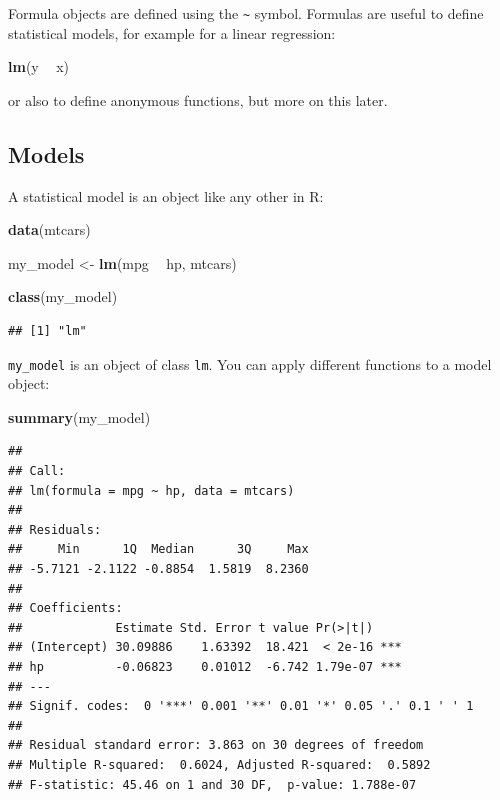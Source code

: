 \documentclass[]{gitbook}
\newenvironment{Shaded}{\begin{snugshade}}{\end{snugshade}}
\newcommand{\KeywordTok}[1]{\textcolor[rgb]{0.13,0.29,0.53}{\textbf{#1}}}
\newcommand{\NormalTok}[1]{#1}
\newcommand{\OperatorTok}[1]{\textcolor[rgb]{0.81,0.36,0.00}{\textbf{#1}}}
\newcommand{\StringTok}[1]{\textcolor[rgb]{0.31,0.60,0.02}{#1}}
\theoremstyle{definition}
\theoremstyle{definition}
\theoremstyle{definition}
\theoremstyle{remark}
\begin{document}
Formula objects are defined using the \texttt{\textasciitilde{}} symbol.
Formulas are useful to define statistical models, for example for a
linear regression:

\begin{Shaded}
\begin{Highlighting}[]
\KeywordTok{lm}\NormalTok{(y }\OperatorTok{~}\StringTok{ }\NormalTok{x)}
\end{Highlighting}
\end{Shaded}

or also to define anonymous functions, but more on this later.

\hypertarget{models}{%
\subsection{Models}\label{models}}

A statistical model is an object like any other in R:

\begin{Shaded}
\begin{Highlighting}[]
\KeywordTok{data}\NormalTok{(mtcars)}

\NormalTok{my_model <-}\StringTok{ }\KeywordTok{lm}\NormalTok{(mpg }\OperatorTok{~}\StringTok{ }\NormalTok{hp, mtcars)}

\KeywordTok{class}\NormalTok{(my_model)}
\end{Highlighting}
\end{Shaded}

\begin{verbatim}
## [1] "lm"
\end{verbatim}

\texttt{my\_model} is an object of class \texttt{lm}. You can apply
different functions to a model object:

\begin{Shaded}
\begin{Highlighting}[]
\KeywordTok{summary}\NormalTok{(my_model)}
\end{Highlighting}
\end{Shaded}

\begin{verbatim}
## 
## Call:
## lm(formula = mpg ~ hp, data = mtcars)
## 
## Residuals:
##     Min      1Q  Median      3Q     Max 
## -5.7121 -2.1122 -0.8854  1.5819  8.2360 
## 
## Coefficients:
##             Estimate Std. Error t value Pr(>|t|)    
## (Intercept) 30.09886    1.63392  18.421  < 2e-16 ***
## hp          -0.06823    0.01012  -6.742 1.79e-07 ***
## ---
## Signif. codes:  0 '***' 0.001 '**' 0.01 '*' 0.05 '.' 0.1 ' ' 1
## 
## Residual standard error: 3.863 on 30 degrees of freedom
## Multiple R-squared:  0.6024, Adjusted R-squared:  0.5892 
## F-statistic: 45.46 on 1 and 30 DF,  p-value: 1.788e-07
\end{verbatim}
\end{document}
